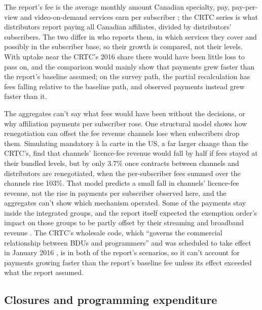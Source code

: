 The report's fee is the average monthly amount Canadian specialty, pay, pay-per-view and video-on-demand services earn per subscriber \citep[para.~180, Table~14]{nordicity2015television}; the CRTC series is what distributors report paying all Canadian affiliates, divided by distributors' subscribers. The two differ in who reports them, in which services they cover and possibly in the subscriber base, so their growth is compared, not their levels. With uptake near the CRTC's 2016 share there would have been little loss to pass on, and the comparison would mainly show that payments grew faster than the report's baseline assumed; on the survey path, the partial recalculation has fees falling relative to the baseline path, and observed payments instead grew faster than it.

The aggregates can't say what fees would have been without the decisions, or why affiliation payments per subscriber rose. One structural model shows how renegotiation can offset the fee revenue channels lose when subscribers drop them. Simulating mandatory à la carte in the US, a far larger change than the CRTC's, \textcite[644, 676--678]{crawford2012bundling} find that channels' licence-fee revenue would fall by half if fees stayed at their bundled levels, but by only 3.7\% once contracts between channels and distributors are renegotiated, when the per-subscriber fees summed over the channels rise 103\%. That model predicts a small fall in channels' licence-fee revenue, not the rise in payments per subscriber observed here, and the aggregates can't show which mechanism operated. Some of the payments stay inside the integrated groups, and the report itself expected the exemption order's impact on those groups to be partly offset by their streaming and broadband revenue \citep[para.~227, p.~83]{nordicity2015television}. The CRTC's wholesale code, which \enquote{governs the commercial relationship between BDUs and programmers} and was scheduled to take effect in January 2016 \citep[p.~72, n.~80; p.~73, n.~82]{nordicity2015television}, is in both of the report's scenarios, so it can't account for payments growing faster than the report's baseline fee unless its effect exceeded what the report assumed.

\subsection{Closures and programming expenditure}


